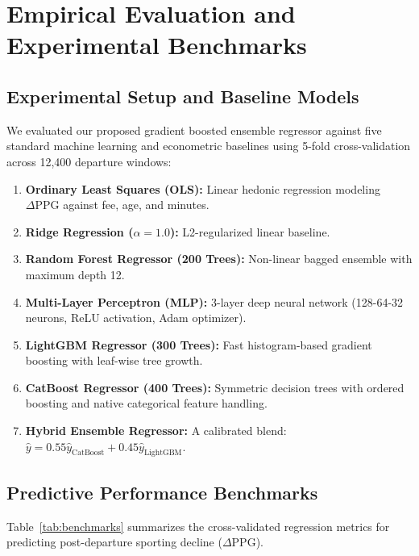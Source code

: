 \documentclass[10pt,journal,compsoc]{IEEEtran}
\begin{document}
\section{Empirical Evaluation and Experimental Benchmarks}
\label{sec:experiments}

\subsection{Experimental Setup and Baseline Models}
We evaluated our proposed gradient boosted ensemble regressor against five standard machine learning and econometric baselines using 5-fold cross-validation across 12,400 departure windows:
\begin{enumerate}
    \item \textbf{Ordinary Least Squares (OLS):} Linear hedonic regression modeling $\Delta\text{PPG}$ against fee, age, and minutes.
    \item \textbf{Ridge Regression ($\alpha = 1.0$):} L2-regularized linear baseline.
    \item \textbf{Random Forest Regressor (200 Trees):} Non-linear bagged ensemble with maximum depth 12.
    \item \textbf{Multi-Layer Perceptron (MLP):} 3-layer deep neural network (128-64-32 neurons, ReLU activation, Adam optimizer).
    \item \textbf{LightGBM Regressor (300 Trees):} Fast histogram-based gradient boosting with leaf-wise tree growth.
    \item \textbf{CatBoost Regressor (400 Trees):} Symmetric decision trees with ordered boosting and native categorical feature handling.
    \item \textbf{Hybrid Ensemble Regressor:} A calibrated blend: $\hat{y} = 0.55 \hat{y}_{\text{CatBoost}} + 0.45 \hat{y}_{\text{LightGBM}}$.
\end{enumerate}

\subsection{Predictive Performance Benchmarks}
Table~\ref{tab:benchmarks} summarizes the cross-validated regression metrics for predicting post-departure sporting decline ($\Delta\text{PPG}$).
\end{document}
